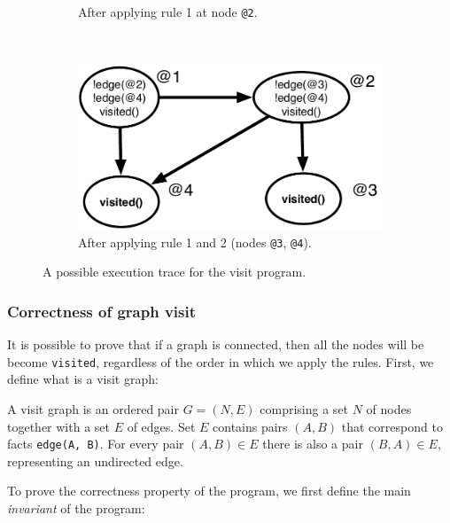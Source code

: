 \begin{figure}[h]
\begin{subfigure}[b]{0.5\textwidth}
                \caption{After applying rule 1 at node \texttt{@2}.}
                \label{fig:exec_trace3}
        \end{subfigure}%
        ~ %
        \begin{subfigure}[b]{0.5\textwidth}
                  \includegraphics[width=\textwidth]{figures/visit/trace4}
                  \caption{After applying rule 1 and 2 (nodes \texttt{@3},
                        \texttt{@4}).}
                  \label{fig:exec_trace4}
          \end{subfigure}
        \caption{A possible execution trace for the visit program.}\label{fig:exec_trace}
\end{figure}

\subsubsection{Correctness of graph visit}

It is possible to prove that if a graph is connected, then all the nodes will be
become \texttt{visited}, regardless of the order in which we apply the rules.
First, we define what is a visit graph:

\begin{definition}
A visit graph is an ordered pair $G = (N, E)$ comprising a set $N$ of nodes together
with a set $E$ of edges. Set $E$ contains pairs $(A, B)$ that correspond to
facts \texttt{\bang edge(A, B)}. For every pair $(A, B) \in E$ there is also a
pair $(B, A) \in E$, representing an undirected edge.
\end{definition}

To prove the correctness property of the program, we first define the main
\emph{invariant} of the program:

